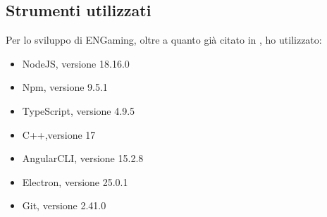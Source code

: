 \subsection{Strumenti utilizzati}
Per lo sviluppo di ENGaming, oltre a quanto già citato in , ho utilizzato:

\begin{itemize}
    \item NodeJS, versione 18.16.0
    \item Npm, versione 9.5.1
    \item TypeScript, versione 4.9.5
    \item C++,versione 17
    \item AngularCLI, versione 15.2.8
    \item Electron, versione 25.0.1
    \item Git, versione 2.41.0
\end{itemize}
